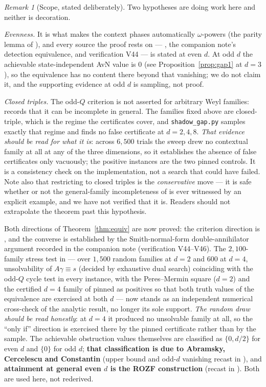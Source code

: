 \documentclass[11pt]{article}
\theoremstyle{remark}
\newtheorem{remark}{Remark}
\theoremstyle{plain}
\begin{document}
\begin{remark}[Scope, stated deliberately]\label{rem:evend}
Two hypotheses are doing work here and neither is decoration.

\emph{Evenness.} It is what makes the context phases automatically $\omega$-powers (the
parity lemma of \cite{note}), and every source the proof rests on --- \cite[Thm.~8]{paperB},
the companion note's detection equivalence, and verification V44 --- is stated at even $d$.
At odd $d$ the achievable state-independent AvN value is $0$ (see
Proposition~\ref{prop:gap1} at $d=3$), so the equivalence has no content there beyond that
vanishing; we do not claim it, and the supporting evidence at odd $d$ is sampling, not proof.

\emph{Closed triples.} The odd-$Q$ criterion is not asserted for arbitrary Weyl families:
\cite[Prop.~9]{paperB} records that it can be incomplete in general. The families fixed
above are closed-triple, which is the regime the certificates cover, and
\texttt{shadow\_gap.py} samples exactly that regime and finds no false certificate at
$d=2,4,8$. \emph{That evidence should be read for what it is}: across $6{,}500$ trials the
sweep drew no contextual family at all at any of the three dimensions, so it establishes the
absence of false certificates only vacuously; the positive instances are the two pinned
controls. It is a consistency check on the implementation, not a search that could have
failed. Note also that restricting to closed triples is the \emph{conservative} move --- it
is safe whether or not the general-family incompleteness of \cite[Prop.~9]{paperB} is ever
witnessed by an explicit example, and we have not verified that it is. Readers should not
extrapolate the theorem past this hypothesis.
\end{remark}

Both directions of Theorem~\ref{thm:equiv} are now proved: the criterion direction is
\cite[Thm.~8]{paperB}, and the converse is established by the Smith-normal-form
double-annihilator argument recorded in the companion note \cite{note} (verification
V44--V46). The $2{,}100$-family stress test in
 --- over
$1{,}500$ random families at $d=2$ and $600$ at $d=4$, unsolvability of $A\gamma\equiv s$
(decided by exhaustive dual search) coinciding with the odd-$Q$ cycle test in every instance,
with the Peres--Mermin square ($d=2$) and the certified $d=4$ family of \cite{paperB} pinned
as positives so that both truth values of the equivalence are exercised at both $d$ --- now
stands as an independent numerical cross-check of the analytic result, no longer its sole
support. \emph{The random draw should be read honestly}: at $d=4$ it produced no unsolvable
family at all, so the ``only if'' direction is exercised there by the pinned certificate rather
than by the sample. The achievable obstruction values themselves are classified as $\{0,d/2\}$
for even $d$ and $\{0\}$ for odd $d$; \textbf{that classification is due to Abramsky,
Cercelescu and Constantin} \cite{ACC} (upper bound and odd-$d$ vanishing recast in
\cite[Thm.~1]{paperB}), and \textbf{attainment at general even $d$ is the ROZF
construction} \cite{ROZF} (recast in \cite[Thm.~7]{paperB}). Both are used here, not
rederived.
\end{document}
